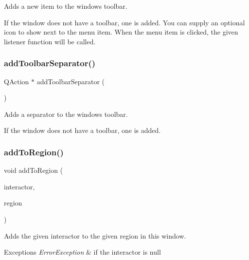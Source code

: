 Adds a new item to the window\textquotesingle{}s toolbar. 

If the window does not have a toolbar, one is added. You can supply an optional icon to show next to the menu item. When the menu item is clicked, the given listener function will be called. \mbox{\label{classGWindow_a885470a4fc1b578a76f6fddc2b1950a2}} 
\subsubsection{\texorpdfstring{add\+Toolbar\+Separator()}{addToolbarSeparator()}}
{\footnotesize\ttfamily Q\+Action $\ast$ add\+Toolbar\+Separator (\begin{DoxyParamCaption}{ }\end{DoxyParamCaption})\hspace{0.3cm}{\ttfamily [virtual]}}



Adds a separator to the window\textquotesingle{}s toolbar. 

If the window does not have a toolbar, one is added. \mbox{\label{classGWindow_aab55413917cdbb2e0560ab415d59fd1f}} 
\subsubsection{\texorpdfstring{add\+To\+Region()}{addToRegion()}\hspace{0.1cm}{\footnotesize\ttfamily [1/4]}}
{\footnotesize\ttfamily void add\+To\+Region (\begin{DoxyParamCaption}\item[{\mbox{\hyperlink{classGInteractor}{G\+Interactor}} $\ast$}]{interactor,  }\item[{\mbox{\hyperlink{classGWindow_a81a01a86de31071a92e6cce0bab9bc4b}{Region}}}]{region }\end{DoxyParamCaption})\hspace{0.3cm}{\ttfamily [virtual]}}



Adds the given interactor to the given region in this window. 


\begin{DoxyExceptions}{Exceptions}
{\em Error\+Exception} & if the interactor is null \\
\hline
\end{DoxyExceptions}
\mbox{\label{classGWindow_a9c8e600889001e6e72d3548918a6baff}} 
